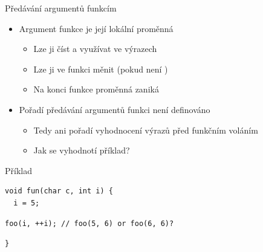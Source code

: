 \begin{frame}[fragile]{Předávání argumentů funkcím}

  \begin{itemize}
    \item Argument funkce je její lokální proměnná
    \begin{itemize}
      \item Lze ji číst a využívat ve výrazech
      \item Lze ji ve funkci měnit (pokud není )
      \item Na konci funkce proměnná zaniká
    \end{itemize}

    \pause

    \item Pořadí předávání argumentů funkci není definováno
    \begin{itemize}
      \item Tedy ani pořadí vyhodnocení výrazů před funkčním voláním

      \pause

      \item Jak se vyhodnotí příklad?
    \end{itemize}

  \end{itemize}


\begin{block}{Příklad}
\begin{lstlisting}[belowskip=0pt]
void fun(char c, int i) {
  i = 5;
\end{lstlisting}
\begin{lstlisting}[aboveskip=0pt,belowskip=0pt]
  foo(i, ++i); // foo(5, 6) or foo(6, 6)?
\end{lstlisting}
\begin{lstlisting}[aboveskip=0pt]
}
\end{lstlisting}
\end{block}

\end{frame}

